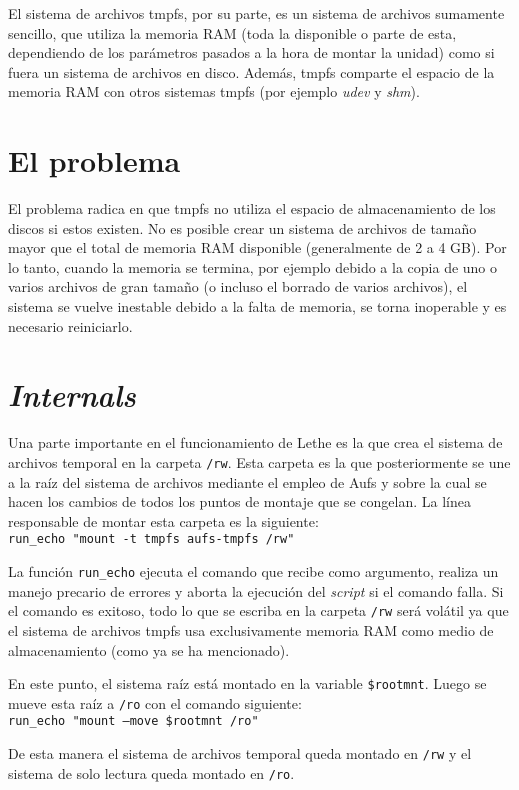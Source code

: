 \documentclass[a4paper,10pt]{article}
\begin{document}
El sistema de archivos tmpfs, por su parte, es un sistema de archivos sumamente sencillo, que utiliza la memoria RAM (toda la
disponible o parte de esta, dependiendo de los parámetros pasados a la hora de montar la unidad) como si fuera un sistema de
archivos en disco. Además, tmpfs comparte el espacio de la memoria RAM con otros sistemas tmpfs (por ejemplo \textit{udev} y
\textit{shm}).

\section{El problema}
El problema radica en que tmpfs no utiliza el espacio de almacenamiento de los discos si estos existen. No es
posible crear un sistema de archivos de tamaño mayor que el total de memoria RAM disponible (generalmente de 2 a 4 GB). Por
lo
tanto, cuando la memoria se termina, por ejemplo debido a la copia de uno o varios archivos de gran tamaño (o incluso el
borrado de varios archivos), el sistema se vuelve inestable debido a la falta de memoria, se torna inoperable y es necesario
reiniciarlo.

\section{\textit{Internals}}
Una parte importante en el funcionamiento de Lethe es la que crea el sistema de archivos temporal en la carpeta
\texttt{/rw}. Esta carpeta es la que posteriormente se une a la raíz del sistema de archivos mediante el empleo de Aufs y
sobre la cual se hacen los cambios de todos los puntos de montaje que se congelan.
La línea responsable de montar esta carpeta es la siguiente:
\\\indent\texttt{run\_echo "mount -t tmpfs aufs-tmpfs /rw"}

La función \texttt{run\_echo} ejecuta el comando que recibe como argumento, realiza un manejo precario de errores y aborta la
ejecución del \textit{script} si el comando falla. Si el comando es exitoso, todo lo que se escriba en la carpeta
\texttt{/rw} será
volátil ya que el sistema de archivos tmpfs usa exclusivamente memoria RAM como medio de almacenamiento (como ya se
ha mencionado).

En este punto, el sistema raíz está montado en la variable \texttt{\${rootmnt}}. Luego se mueve esta raíz a \texttt{/ro}
con el comando siguiente:
\\\indent\texttt{run\_echo "mount --move \${rootmnt} /ro"}

De esta manera el sistema de archivos temporal queda montado en \texttt{/rw} y el sistema de solo lectura queda montado en
\texttt{/ro}.
\end{document}
